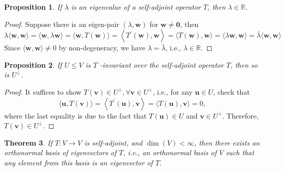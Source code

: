 \documentclass[11pt]{article}
\newtheorem{theorem}{Theorem}[section]
\newtheorem{proposition}[theorem]{Proposition}
\begin{document}
\begin{proposition} If \(\lambda\) is an eigenvalue of a self-adjoint operator \(T\), then \(\lambda  \in  \mathbb{R}\).
\end{proposition}

\begin{proof} Suppose there is an eigen-pair \(\left( {\lambda ,\mathbf{w}}\right)\) for \(\mathbf{w} \neq  \mathbf{0}\), then
\[
\lambda \langle \mathbf{w},\mathbf{w}\rangle  = \langle \mathbf{w},\lambda \mathbf{w}\rangle = \langle \mathbf{w},T\left( \mathbf{w}\right) \rangle  = \left\langle  {{T}^{\prime }\left( \mathbf{w}\right) ,\mathbf{w}}\right\rangle = \langle T\left( \mathbf{w}\right) ,\mathbf{w}\rangle  = \langle \lambda \mathbf{w},\mathbf{w}\rangle = \bar{\lambda }\langle \mathbf{w},\mathbf{w}\rangle
\]
Since \(\langle \mathbf{w},\mathbf{w}\rangle  \neq  0\) by non-degeneracy, we have \(\lambda  = \bar{\lambda }\), i.e., \(\lambda  \in  \mathbb{R}\).
\end{proof}


\begin{proposition} If \(U \leq  V\) is \(T\) -invariant over the self-adjoint operator \(T\), then so is \({U}^{ \bot  }\).
\end{proposition}

\begin{proof} It suffices to show \(T\left( \mathbf{v}\right)  \in  {U}^{ \bot  },\forall \mathbf{v} \in  {U}^{ \bot  }\), i.e., for any \(\mathbf{u} \in  U\), check that
\[
\langle \mathbf{u},T\left( \mathbf{v}\right) \rangle  = \left\langle  {{T}^{\prime }\left( \mathbf{u}\right) ,\mathbf{v}}\right\rangle   = \langle T\left( \mathbf{u}\right) ,\mathbf{v}\rangle  = 0,
\]
where the last equality is due to the fact that \(T\left( \mathbf{u}\right)  \in  U\) and \(\mathbf{v} \in  {U}^{ \bot  }\). Therefore, \(T\left( \mathbf{v}\right)  \in  {U}^{ \bot  }\).
\end{proof}

\begin{theorem} If \(T : V \rightarrow  V\) is self-adjoint, and \(\dim \left( V\right)  < \infty\), then there exists an orthonormal basis of eigenvectors of \(T\), i.e., an orthonormal basis of \(V\) such that any element from this basis is an eigenvector of \(T\).
\end{theorem}
\end{document}
